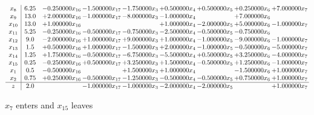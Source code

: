 \documentclass[10pt]{article}
\begin{document}
 \[\begin{array}{c| c c@{\hskip 2pt} c@{\hskip 2pt} c@{\hskip 2pt} c@{\hskip 2pt} c@{\hskip 2pt} c@{\hskip 2pt} c@{\hskip 2pt} }
 x_{8}   &  6.25 & -0.250000 x_{16} & -1.500000 x_{17} & -1.750000 x_{3} & + 0.500000 x_{4} & + 0.500000 x_{5} & + 0.250000 x_{6} & + 7.000000 x_{7}\\
 x_{9}   &  13.0 & + 2.000000 x_{16} & -1.000000 x_{17} & -8.000000 x_{3} & -1.000000 x_{4} &   & + 7.000000 x_{6} &   \\
 x_{10}   &  13.0 & + 1.000000 x_{16} &    &   & + 1.000000 x_{4} & -2.000000 x_{5} & + 5.000000 x_{6} & -1.000000 x_{7}\\
 x_{11}   &  5.25 & -0.250000 x_{16} & -0.500000 x_{17} & -0.750000 x_{3} & -2.500000 x_{4} & -0.500000 x_{5} & -0.750000 x_{6} &   \\
 x_{12}   &  9.0 & -2.000000 x_{16} & + 1.000000 x_{17} & + 9.000000 x_{3} & + 1.000000 x_{4} & -1.000000 x_{5} & -9.000000 x_{6} & -1.000000 x_{7}\\
 x_{13}   &  1.5 & + 0.500000 x_{16} & + 1.000000 x_{17} & -1.500000 x_{3} & + 2.000000 x_{4} & -1.000000 x_{5} & -0.500000 x_{6} & -5.000000 x_{7}\\
 x_{14}   &  1.25 & + 1.750000 x_{16} & -0.500000 x_{17} & -6.750000 x_{3} & -5.500000 x_{4} & + 0.500000 x_{5} & + 3.250000 x_{6} & -4.000000 x_{7}\\
 x_{15}   &  0.25 & -0.250000 x_{16} & + 0.500000 x_{17} & + 3.250000 x_{3} & + 1.500000 x_{4} & -0.500000 x_{5} & + 1.250000 x_{6} & -1.000000 x_{7}\\
 x_{1}   &  0.5 & -0.500000 x_{16} &   & + 1.500000 x_{3} & + 1.000000 x_{4} &   & -1.500000 x_{6} & + 1.000000 x_{7}\\
 x_{2}   &  0.75 & + 0.250000 x_{16} & -0.500000 x_{17} & -1.250000 x_{3} & -0.500000 x_{4} & -0.500000 x_{5} & + 0.750000 x_{6} & + 1.000000 x_{7}\\
\hline
z    &  2.0  &   & -1.000000 x_{17} & -1.000000 x_{3} & -2.000000 x_{4} & -2.000000 x_{5} &   & + 1.000000 x_{7}\\
\end{array}\]


 $ x_{7} $ enters and $ x_{15} $ leaves 
\end{document}
